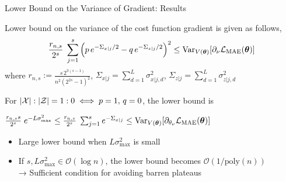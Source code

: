 \documentclass[dvipdfmx,10pt,aspectratio=169]{beamer}
\begin{document}
\begin{frame}{Lower Bound on the Variance of Gradient: Results}
    \begin{theorem}
        Lower bound on the variance of the cost function gradient is given as follows,
        \begin{align*}
            \frac{r_{n,s}}{2^s}\;
            \sum_{j=1}^s \qty(p\,e^{-\Sigma_{x|j}/2} - q\,e^{-\Sigma_{z|j}/2})^2
            \leq \operatorname{Var}_{V(\vb*{\theta})}[\partial_\nu\mathcal{L}_{\mathrm{MAE}}(\vb*{\theta})]
        \end{align*}
        where $r_{n,s} := \frac{s\,2^{3(s-1)}}{n^2(2^{2s}-1)^2}$, $\Sigma_{x|j} = \sum_{d=1}^L \sigma_{x|j,d}^2$, $\Sigma_{z|j} = \sum_{d=1}^L \sigma_{z|j,d}^2$
    \end{theorem}
    
    For $|\mathcal{X}|:|\mathcal{Z}| = 1:0 \iff p = 1,\,q = 0$, the lower bound is
    \begin{center}
        $
            \frac{r_{n,s}s}{2^s}\; e^{-L\sigma_{\max}^2}
            \leq \frac{r_{n,s}}{2^s}\;\sum_{j=1}^s e^{-\Sigma_{x|j}}
            \leq \operatorname{Var}_{V(\vb*{\theta})}[\partial_{\theta_\nu}\mathcal{L}_{\mathrm{MAE}}(\vb*{\theta})]
        $
    \end{center}

    \begin{itemize}
        \item Large lower bound when $L\sigma_{\max}^2$ is small
        \item If $s, L\sigma_{\max}^2 \in \mathcal{O}(\log{n})$, the lower bound becomes $\mathcal{O}(1/\text{poly}(n))$\\ → Sufficient condition for avoiding barren plateaus
    \end{itemize}
\end{frame}
\end{document}
